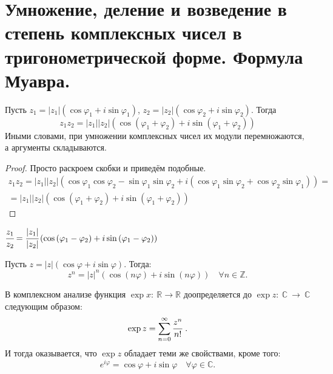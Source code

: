 \section{Умножение, деление и возведение в степень комплексных чисел в тригонометрической форме. Формула Муавра.}

\begin{Suggestion}
Пусть $z_1 = |z_1|\left(\cos{\varphi_1}+i\sin{\varphi_1}\right)$, $z_2 = |z_2|\left(\cos{\varphi_2} + i\sin{\varphi_2}\right)$. Тогда 
\[
z_1z_2 = |z_1||z_2|\left(\cos\left(\varphi_1 + \varphi_2\right) + i\sin\left(\varphi_1 + \varphi_2\right)\right)
\]
Иными словами, при умножении комплексных чисел их модули перемножаются, а аргументы складываются.
\end{Suggestion}

\begin{proof}
Просто раскроем скобки и приведём подобные.
\begin{gather*}
z_1z_2 = |z_1||z_2|\left(\cos\varphi_1\cos\varphi_2-\sin\varphi_1\sin\varphi_2 + i\left(\cos\varphi_1\sin\varphi_2+\cos\varphi_2\sin\varphi_1\right)\right) = \\ =|z_1||z_2|\left(\cos\left(\varphi_1 + \varphi_2\right) + i\sin\left(\varphi_1 + \varphi_2\right)\right)
\end{gather*}
\end{proof}

\begin{Consequence}
$\cfrac{z_1}{z_2} = \cfrac{|z_1|}{|z_2|}\left(\cos\left(\varphi_1-\varphi_2\right) + i\sin\left(\varphi_1 - \varphi_2\right)\right)$
\end{Consequence}

\begin{Consequence}
Пусть $z = |z|\left(\cos\varphi + i \sin \varphi\right)$. Тогда:
\[z^n = |z|^n\left(\cos\left(n\varphi\right)+i\sin\left(n\varphi\right)\right) \quad \forall n \in \mathbb{Z}.
\]
\end{Consequence}

\begin{Comment}
В комплексном анализе функция $\exp x\colon\ \mathbb{R} \rightarrow \mathbb{R}$ доопределяется до $\exp z\colon \ \mathbb{C}~\rightarrow~\mathbb{C}$ следующим образом:
\[
\exp z =\sum\limits_{n=0}^{\infty}\cfrac{z^n}{n!}\ .
\]
И тогда оказывается, что $\exp z$ обладает теми же свойствами, кроме того:
\[
e^{i\varphi} = \cos\varphi + i\sin\varphi \quad \forall \varphi \in \mathbb{C}.
\]
\end{Comment}

